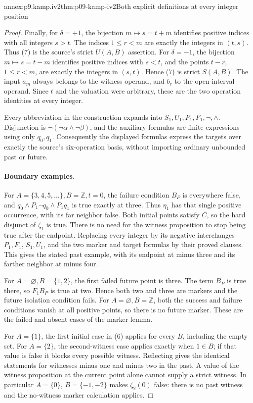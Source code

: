 \begin{annexitem}{annex:p9.kamp.iv2}{thm:p09-kamp-iv2}{Both explicit definitions at every integer position}
\begin{proof}
Finally, for \(\delta=+1\), the bijection
\(m\mapsto s=t+m\) identifies positive indices with
all integers \(s>t\). The indices \(1\leq r<m\)
are exactly the integers in \((t,s)\). Thus (7) is
the source's strict \(U(A,B)\) assertion. For
\(\delta=-1\), the bijection \(m\mapsto s=t-m\)
identifies positive indices with \(s<t\), and the
points \(t-r\), \(1\leq r<m\), are exactly the
integers in \((s,t)\). Hence (7) is strict
\(S(A,B)\). The input \(a_m\) always belongs to
the witness operand, and \(b_r\) to the open-interval
operand. Since \(t\) and the valuation were arbitrary,
these are the two operation identities at every integer.

Every abbreviation in the construction expands into
\(S_1,U_1,P_1,F_1,\neg,\land\). Disjunction is
\(\neg(\neg\alpha\land\neg\beta)\), and the
auxiliary formulas are finite expressions using only
\(q_0,q_1\). Consequently the displayed formulas
express the targets over exactly the source's six-operation
basis, without importing ordinary unbounded past or future.

\paragraph{Boundary examples.}
For \(A=\{3,4,5,\ldots\},B=\mathbb Z,t=0\),
the failure condition \(B_P\) is everywhere false,
and \(q_0\land P_1\neg q_0\land P_1q_1\) is
true exactly at three. Thus \(\eta_1\) has that
single positive occurrence, with its far neighbor false.
Both initial points satisfy \(C\), so the hard
disjunct of \(\zeta_1\) is true. There is no need
for the witness proposition to stop being true after
the endpoint. Replacing every integer by its negative
interchanges \(P_1,F_1\), \(S_1,U_1\), and the
two marker and target formulas by their proved clauses.
This gives the stated past example, with its endpoint
at minus three and its farther neighbor at minus four.

For \(A=\varnothing,B=\{1,2\}\), the first failed
future point is three. The term \(B_P\) is true
there, so \(F_1B_P\) is true at two. Hence both
two and three are markers and the future isolation
condition fails. For \(A=\varnothing,B=\mathbb Z\),
both the success and failure conditions vanish at all
positive points, so there is no future marker. These
are the failed and absent cases of the marker lemma.

For \(A=\{1\}\), the first initial case in (6)
applies for every \(B\), including the empty set.
For \(A=\{2\}\), the second-witness case applies
exactly when \(1\in B\); if that value is false
it blocks every possible witness. Reflecting gives
the identical statements for witnesses minus one and
minus two in the past. A value of the witness
proposition at the current point alone cannot supply
a strict witness. In particular \(A=\{0\}\),
\(B=\{-1,-2\}\) makes \(\zeta_2(0)\) false:
there is no past witness and the no-witness marker
calculation applies.


\end{proof}
\end{annexitem}

